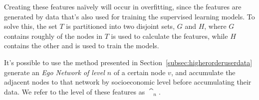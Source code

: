 Creating these features naïvely will occur in overfitting, since the features are generated by data that's also used for training the supervised learning models. To solve this, the set $T$ is partitioned into two disjoint sets, $G$ and $H$, where $G$ contains roughly  of the nodes in $T$ is used to calculate the features, while $H$ contains the other  and is used to train the models.

It's possible to use the method presented in Section~\ref{subsec:higherorderuserdata} generate an \emph{Ego Network of level $n$} of a certain node $v$, and accumulate the adjacent nodes to that network by socioeconomic level before accumulating their data. We refer to the level of these features as $\cat_n$.
